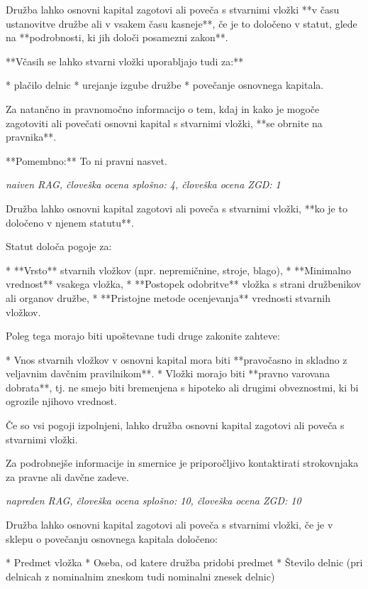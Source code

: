 \documentclass[a4paper,12pt,openright]{book}
\begin{document}
Družba lahko osnovni kapital zagotovi ali poveča s stvarnimi vložki **v času ustanovitve družbe ali v vsakem času kasneje**, če je to določeno v statut,  glede na **podrobnosti, ki jih določi posamezni zakon**.

**Včasih se lahko stvarni vložki uporabljajo tudi za:**

* plačilo delnic
* urejanje izgube družbe
* povečanje osnovnega kapitala.


Za natančno in pravnomočno informacijo o tem, kdaj in kako je mogoče zagotoviti ali povečati osnovni kapital s stvarnimi vložki, **se obrnite na pravnika**.

**Pomembno:** To ni pravni nasvet.

\vspace{0.5cm}
\textit{naiven RAG, človeška ocena splošno: 4, človeška ocena ZGD: 1}

Družba lahko osnovni kapital zagotovi ali poveča s stvarnimi vložki, **ko je to določeno v njenem statutu**.

Statut določa pogoje za:

* **Vrsto** stvarnih vložkov (npr. nepremičnine, stroje, blago),
* **Minimalno vrednost** vsakega vložka,
* **Postopek odobritve** vložka s strani družbenikov ali organov družbe,
* **Pristojne metode ocenjevanja** vrednosti stvarnih vložkov.

Poleg tega morajo biti upoštevane tudi druge zakonite zahteve:


* Vnos stvarnih vložkov v osnovni kapital mora biti **pravočasno in skladno z veljavnim davčnim pravilnikom**.
* Vložki morajo biti **pravno varovana dobrata**, tj. ne smejo biti bremenjena s hipoteko ali drugimi obveznostmi, ki bi ogrozile njihovo vrednost.

Če so vsi pogoji izpolnjeni, lahko družba osnovni kapital zagotovi ali poveča s stvarnimi vložki.


Za podrobnejše informacije in smernice je priporočljivo kontaktirati strokovnjaka za pravne ali davčne zadeve.

\vspace{0.5cm}
\textit{napreden RAG, človeška ocena splošno: 10, človeška ocena ZGD: 10}

Družba lahko osnovni kapital zagotovi ali poveča s stvarnimi vložki, če je v sklepu o povečanju osnovnega kapitala določeno:

* Predmet vložka
* Oseba, od katere družba pridobi predmet
* Število delnic (pri delnicah z nominalnim zneskom tudi nominalni znesek delnic)
\end{document}
